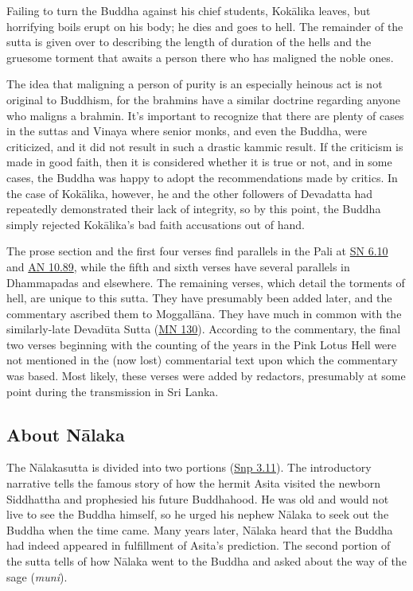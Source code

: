 \documentclass[12pt,openany]{book}%
\begin{document}
Failing to turn the Buddha against his chief students, \textsanskrit{Kokālika} leaves, but horrifying boils erupt on his body; he dies and goes to hell. The remainder of the sutta is given over to describing the length of duration of the hells and the gruesome torment that awaits a person there who has maligned the noble ones.

The idea that maligning a person of purity is an especially heinous act is not original to Buddhism, for the brahmins have a similar doctrine regarding anyone who maligns a brahmin. It’s important to recognize that there are plenty of cases in the suttas and Vinaya where senior monks, and even the Buddha, were criticized, and it did not result in such a drastic kammic result. If the criticism is made in good faith, then it is considered whether it is true or not, and in some cases, the Buddha was happy to adopt the recommendations made by critics. In the case of \textsanskrit{Kokālika}, however, he and the other followers of Devadatta had repeatedly demonstrated their lack of integrity, so by this point, the Buddha simply rejected \textsanskrit{Kokālika}’s bad faith accusations out of hand.

The prose section and the first four verses find parallels in the Pali at \href{https://suttacentral.net/sn6.10/en/sujato}{SN 6.10} and \href{https://suttacentral.net/an10.89/en/sujato}{AN 10.89}, while the fifth and sixth verses have several parallels in Dhammapadas and elsewhere. The remaining verses, which detail the torments of hell, are unique to this sutta. They have presumably been added later, and the commentary ascribed them to \textsanskrit{Moggallāna}. They have much in common with the similarly-late \textsanskrit{Devadūta} Sutta (\href{https://suttacentral.net/mn130/en/sujato}{MN 130}). According to the commentary, the final two verses beginning with the counting of the years in the Pink Lotus Hell were not mentioned in the (now lost) commentarial text upon which the commentary was based. Most likely, these verses were added by redactors, presumably at some point during the transmission in Sri Lanka.

\subsection*{About \textsanskrit{Nālaka}}

The \textsanskrit{Nālakasutta} is divided into two portions (\href{https://suttacentral.net/snp3.11/en/sujato}{Snp 3.11}). The introductory narrative tells the famous story of how the hermit Asita visited the newborn Siddhattha and prophesied his future Buddhahood. He was old and would not live to see the Buddha himself, so he urged his nephew \textsanskrit{Nālaka} to seek out the Buddha when the time came. Many years later, \textsanskrit{Nālaka} heard that the Buddha had indeed appeared in fulfillment of Asita’s prediction. The second portion of the sutta tells of how \textsanskrit{Nālaka} went to the Buddha and asked about the way of the sage (\textit{muni}).
\end{document}
